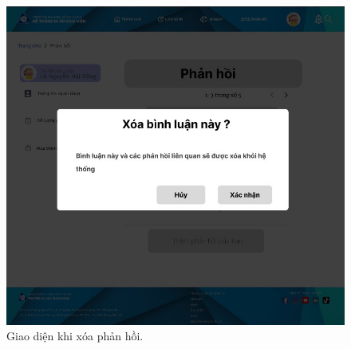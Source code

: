 \begin{figure}[H]
    \begin{center}
        \includegraphics[width=1\textwidth]{Images/Figma/deletecmt.png}
        \caption{Giao diện khi xóa phản hồi.}
        \label{fig:arch}
    \end{center}
\end{figure}